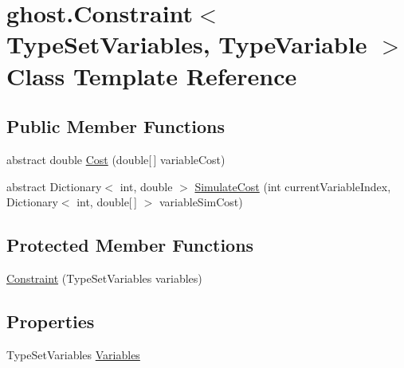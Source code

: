 \hypertarget{classghost_1_1Constraint_3_01TypeSetVariables_00_01TypeVariable_01_4}{\section{ghost.\-Constraint$<$ Type\-Set\-Variables, Type\-Variable $>$ Class Template Reference}
\label{classghost_1_1Constraint_3_01TypeSetVariables_00_01TypeVariable_01_4}
}
\subsection*{Public Member Functions}
\begin{DoxyCompactItemize}
\item 
abstract double \hyperlink{classghost_1_1Constraint_3_01TypeSetVariables_00_01TypeVariable_01_4_ac4aba3edfc75f14a974cf45c9a4fbe0d}{Cost} (double\mbox{[}$\,$\mbox{]} variable\-Cost)
\item 
abstract Dictionary$<$ int, double $>$ \hyperlink{classghost_1_1Constraint_3_01TypeSetVariables_00_01TypeVariable_01_4_a5ac6b63a92e54e8812bcdd414763d852}{Simulate\-Cost} (int current\-Variable\-Index, Dictionary$<$ int, double\mbox{[}$\,$\mbox{]} $>$ variable\-Sim\-Cost)
\end{DoxyCompactItemize}
\subsection*{Protected Member Functions}
\begin{DoxyCompactItemize}
\item 
\hyperlink{classghost_1_1Constraint_3_01TypeSetVariables_00_01TypeVariable_01_4_af5f29309c2d8a5874f8e89d9237ae156}{Constraint} (Type\-Set\-Variables variables)
\end{DoxyCompactItemize}
\subsection*{Properties}
\begin{DoxyCompactItemize}
\item 
Type\-Set\-Variables \hyperlink{classghost_1_1Constraint_3_01TypeSetVariables_00_01TypeVariable_01_4_a22327beeea2a2d774f85477a9fdd7b55}{Variables}
\end{DoxyCompactItemize}


